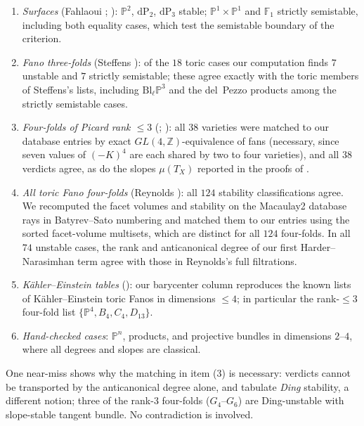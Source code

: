 \documentclass[11pt]{amsart}
\theoremstyle{definition}
\theoremstyle{remark}
\newcommand{\PP}{\mathbb{P}}
\newcommand{\ZZ}{\mathbb{Z}}
\newcommand{\dP}{\mathrm{dP}}
\begin{document}
\begin{enumerate}
\item \emph{Surfaces} (Fahlaoui \cite{Fahlaoui1989}; \cite[Thm.~1.3,
Cor.~3.1]{HNS2022}): $\PP^2$, $\dP_2$, $\dP_3$ stable; $\PP^1\times\PP^1$
and $\mathbb{F}_1$ strictly semistable, including both equality cases,
which test the semistable boundary of the criterion.
\item \emph{Fano three-folds} (Steffens \cite{Steffens1996}): of the
$18$ toric cases our computation finds $7$ unstable and $7$ strictly
semistable; these agree exactly with the toric members of Steffens's
lists, including
$\mathrm{Bl}_{\ell}\PP^3$ and the del~Pezzo products among the strictly
semistable cases.
\item \emph{Four-folds of Picard rank $\le 3$}
(\cite{BDGP2021}; \cite[Table~1]{DDK}): all $38$ varieties were matched
to our database entries by exact $GL(4,\ZZ)$-equivalence of fans
(necessary, since seven values of $(-K)^4$ are each shared by two to four
varieties), and all $38$ verdicts agree, as do the slopes
$\mu(T_X)$ reported in the proofs of \cite{DDK}.
\item \emph{All toric Fano four-folds} (Reynolds \cite[Appendix~A]{Reynolds2023}):
all $124$ stability classifications agree. We recomputed the facet volumes
and stability on the Macaulay2 database rays in Batyrev--Sato numbering
and matched them to our entries using the sorted facet-volume multisets,
which are distinct for all $124$ four-folds. In all $74$ unstable cases,
the rank and anticanonical degree of our first Harder--Narasimhan term
agree with those in Reynolds's full filtrations.
\item \emph{K\"ahler--Einstein tables}
(\cite{Mabuchi1987,Nakagawa1993,Nakagawa1994,NSY2023}): our barycenter
column
reproduces the known lists of K\"ahler--Einstein toric Fanos in
dimensions $\le 4$; in particular the rank-$\le 3$ four-fold list
$\{\PP^4, B_4, C_4, D_{13}\}$.
\item \emph{Hand-checked cases}: $\PP^n$, products, and projective
bundles in dimensions $2$--$4$, where all degrees and slopes are
classical.
\end{enumerate}

One near-miss shows why the matching in item (3) is necessary:
verdicts cannot be transported by the anticanonical degree alone,
and \cite{NSY2023} tabulate \emph{Ding} stability, a different notion;
three of the rank-$3$ four-folds ($G_4$--$G_6$) are Ding-unstable
with slope-stable tangent bundle. No contradiction is involved.
\end{document}

